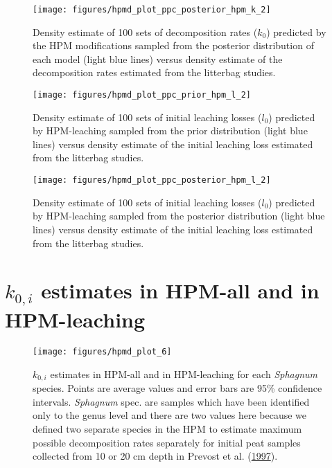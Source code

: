 \documentclass[
  12pt,
]{article}
\begin{document}
\begin{figure}[H]

{\centering \texttt{[image: figures/hpmd\_plot\_ppc\_posterior\_hpm\_k\_2]} 

}

\caption{Density estimate of 100 sets of decomposition rates (\(k_0\)) predicted by the HPM modifications sampled from the posterior distribution of each model (light blue lines) versus density estimate of the decomposition rates estimated from the litterbag studies.}\label{fig:sup-hpmd-plot-ppc-posterior-hpm-k-2}
\end{figure}



\begin{figure}[H]

{\centering \texttt{[image: figures/hpmd\_plot\_ppc\_prior\_hpm\_l\_2]} 

}

\caption{Density estimate of 100 sets of initial leaching losses (\(l_0\)) predicted by HPM-leaching sampled from the prior distribution (light blue lines) versus density estimate of the initial leaching loss estimated from the litterbag studies.}\label{fig:sup-hpmd-plot-ppc-prior-hpm-l-2}
\end{figure}



\begin{figure}[H]

{\centering \texttt{[image: figures/hpmd\_plot\_ppc\_posterior\_hpm\_l\_2]} 

}

\caption{Density estimate of 100 sets of initial leaching losses (\(l_0\)) predicted by HPM-leaching sampled from the posterior distribution (light blue lines) versus density estimate of the initial leaching loss estimated from the litterbag studies.}\label{fig:sup-hpmd-plot-ppc-posterior-hpm-l-2}
\end{figure}

\hypertarget{sup-4}{%
\section{\texorpdfstring{\(k_{0,i}\) estimates in HPM-all and in HPM-leaching}{k\_\{0,i\} estimates in HPM-all and in HPM-leaching}}\label{sup-4}}



\begin{figure}[H]

{\centering \texttt{[image: figures/hpmd\_plot\_6]} 

}

\caption{\(k_{0,i}\) estimates in HPM-all and in HPM-leaching for each \emph{Sphagnum} species. Points are average values and error bars are 95\% confidence intervals. \emph{Sphagnum} spec. are samples which have been identified only to the genus level and there are two values here because we defined two separate species in the HPM to estimate maximum possible decomposition rates separately for initial peat samples collected from 10 or 20 cm depth in Prevost et al. (\protect\hyperlink{ref-Prevost.1997}{1997}).}\label{fig:sup-hpmd-plot-6}
\end{figure}
\end{document}
